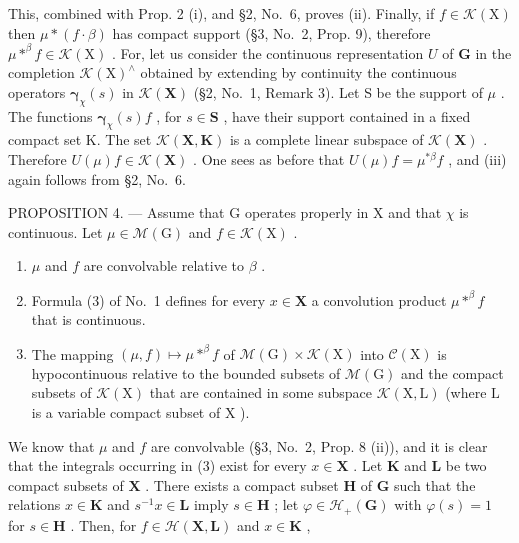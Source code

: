 This, combined with Prop. 2 (i), and §2, No.~6, proves (ii). Finally, if \(f \in \mathcal{K}(\mathrm{X})\) then \(\mu * (f \cdot \beta)\) has compact support (§3, No.~2, Prop. 9), therefore \(\mu *^{\beta} f \in \mathcal{K}(\mathrm{X})\) . For, let us consider the continuous representation \(U\) of \(\mathbf{G}\) in the completion \(\mathcal{K}(\mathrm{X})^{\wedge}\) obtained by extending by continuity the continuous operators \(\pmb{\gamma}_{\chi}(s)\) in \(\mathcal{K}(\mathbf{X})\) (§2, No.~1, Remark 3). Let S be the support of \(\mu\) . The functions \(\pmb{\gamma}_{\chi}(s)f\) , for \(s \in \mathbf{S}\) , have their support contained in a fixed compact set K. The set \(\mathcal{K}(\mathbf{X}, \mathbf{K})\) is a complete linear subspace of \(\mathcal{K}(\mathbf{X})\) . Therefore \(U(\mu)f \in \mathcal{K}(\mathbf{X})\) . One sees as before that \(U(\mu)f = \mu^{*\beta}f\) , and (iii) again follows from §2, No.~6.

PROPOSITION 4. --- Assume that G operates properly in X and that \(\chi\) is continuous. Let \(\mu \in \mathcal{M}(\mathrm{G})\) and \(f \in \mathcal{K}(\mathrm{X})\) .

\begin{enumerate}
\def\labelenumi{(\roman{enumi})}
\item
  \(\mu\) and \(f\) are convolvable relative to \(\beta\) .
\item
  Formula (3) of No.~1 defines for every \(x \in \mathbf{X}\) a convolution product \(\mu *^{\beta}f\) that is continuous.
\item
  The mapping \((\mu, f) \mapsto \mu *^{\beta}f\) of \(\mathcal{M}(\mathrm{G}) \times \mathcal{K}(\mathrm{X})\) into \(\mathcal{C}(\mathrm{X})\) is hypocontinuous relative to the bounded subsets of \(\mathcal{M}(\mathrm{G})\) and the compact subsets of \(\mathcal{K}(\mathrm{X})\) that are contained in some subspace \(\mathcal{K}(\mathrm{X}, \mathrm{L})\) (where \(\mathrm{L}\) is a variable compact subset of \(\mathrm{X}\) ).
\end{enumerate}

We know that \(\mu\) and \(f\) are convolvable (§3, No.~2, Prop. 8 (ii)), and it is clear that the integrals occurring in (3) exist for every \(x \in \mathbf{X}\) . Let \(\mathbf{K}\) and \(\mathbf{L}\) be two compact subsets of \(\mathbf{X}\) . There exists a compact subset \(\mathbf{H}\) of \(\mathbf{G}\) such that the relations \(x \in \mathbf{K}\) and \(s^{-1}x \in \mathbf{L}\) imply \(s \in \mathbf{H}\) ; let \(\varphi \in \mathcal{H}_{+}(\mathbf{G})\) with \(\varphi(s) = 1\) for \(s \in \mathbf{H}\) . Then, for \(f \in \mathcal{H}(\mathbf{X}, \mathbf{L})\) and \(x \in \mathbf{K}\) ,

